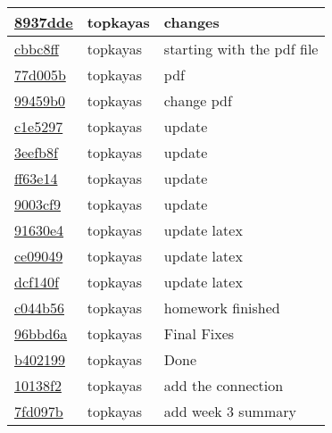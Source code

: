\begin{tabular}{l l l}
\href{git@github.com:topkayas/CS444/commit/8937dde711a688881683e2152fe987dca0021c3a}{8937dde} & topkayas & changes\\\hline
\href{git@github.com:topkayas/CS444/commit/cbbc8ff7c82f89baa2d096fe8a62432bf2d8002a}{cbbc8ff} & topkayas & starting with the pdf file\\\hline
\href{git@github.com:topkayas/CS444/commit/77d005ba46dff628ae08cbf01501ac260fa9bae4}{77d005b} & topkayas & pdf\\\hline
\href{git@github.com:topkayas/CS444/commit/99459b04d20c397edfe76334ee23804c014fa7fd}{99459b0} & topkayas & change pdf\\\hline
\href{git@github.com:topkayas/CS444/commit/c1e529725300d2017c355c06db4a17df5557cbb5}{c1e5297} & topkayas & update\\\hline
\href{git@github.com:topkayas/CS444/commit/3eefb8fe8b6feb386fb728920dc22866fe264185}{3eefb8f} & topkayas & update\\\hline
\href{git@github.com:topkayas/CS444/commit/ff63e14ca05eff15c6eabeb6004dfbeadb56d630}{ff63e14} & topkayas & update\\\hline
\href{git@github.com:topkayas/CS444/commit/9003cf91fc096990444cbdebb32a0b81b6eccc68}{9003cf9} & topkayas & update\\\hline
\href{git@github.com:topkayas/CS444/commit/91630e465af29a2114228f046547399cb34dc840}{91630e4} & topkayas & update latex\\\hline
\href{git@github.com:topkayas/CS444/commit/ce0904949a518e35ceb040fc1c678832a315bc9c}{ce09049} & topkayas & update latex\\\hline
\href{git@github.com:topkayas/CS444/commit/dcf140f4c18d0aaf99c6cb44ccfbd28eb8c82e65}{dcf140f} & topkayas & update latex\\\hline
\href{git@github.com:topkayas/CS444/commit/c044b5690fcbcef470fbb0be53975ae3b1f1e3c8}{c044b56} & topkayas & homework finished\\\hline
\href{git@github.com:topkayas/CS444/commit/96bbd6a784b8df8c6fdcc33ac81f2e569922a0a2}{96bbd6a} & topkayas & Final Fixes\\\hline
\href{git@github.com:topkayas/CS444/commit/b402199c2c1413ade4a29208c79c37473849b72e}{b402199} & topkayas & Done\\\hline
\href{git@github.com:topkayas/CS444/commit/10138f23a95e52a82bd685409718b1065010a0f4}{10138f2} & topkayas & add the connection\\\hline
\href{git@github.com:topkayas/CS444/commit/7fd097bf7aeaa5223e66b45bcaf01261d4ddc548}{7fd097b} & topkayas & add week 3 summary\\\hline

\end{tabular}

